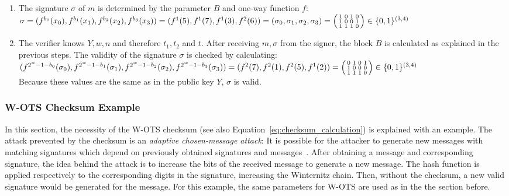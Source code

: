\begin{enumerate}
\item %
The signature $\sigma$ of $m$ is determined by the parameter $B$ and one-way function $f$: \\ %
$\sigma = (f^{b_0}(x_0), f^{b_1}(x_1),f^{b_2}(x_2),f^{b_3}(x_3)) = (f^1(5),f^1(7),f^1(3),f^2(6)) = (\sigma_0, \sigma_1, \sigma_2, \sigma_3) = \\
\begin{psmallmatrix}
1 & 0 & 1 & 0 \\
1 & 0 & 0 & 1 \\
1 & 1 & 1 & 0
\end{psmallmatrix} \in \{0,1\}^{(3,4)} $

\item The verifier knows $Y, w, n$ and therefore $t_1, t_2$ and $t$. After receiving $m, \sigma$ from the signer, the block $B$ is calculated as explained in the previous steps. The validity of the signature $\sigma$ is checked by calculating: \\
$( f^{2^w-1-b_0}(\sigma_0), f^{2^w-1-b_1}(\sigma_1), f^{2^w-1-b_2}(\sigma_2), f^{2^w-1-b_3}(\sigma_3)) = (f^2(7) , f^2(1), f^2(5), f^1(2)) = \\ \begin{psmallmatrix}
0 & 1 & 0 & 1 \\
1 & 0 & 0 & 0 \\
1 & 1 & 1 & 0
\end{psmallmatrix} \in \{0,1\}^{(3,4)} $
\\ Because these values are the same as in the public key $Y$, $\sigma$ is valid. 

\end{enumerate}

\subsubsection{W-OTS Checksum Example}
\label{sec:checksum_explained}
In this section, the necessity of the W-OTS checksum (see also Equation~\ref{eq:checksum_calculation}) is explained with an example. 
The attack prevented by the checksum is an \textit{adaptive chosen-message attack}: It is possible for the attacker to generate new messages with matching signatures which depend on previously obtained signatures and messages~\cite{cha:bg_signature_schemes_book_menezes2018_1997}. 
After obtaining a message and corresponding signature, the idea behind the attack is to increase the bits of the received message to generate a new message. The hash function is applied respectively to the corresponding digits in the signature, increasing the Winternitz chain. Then, without the checksum, a new valid signature would be generated for the message. For this example, the same parameters for W-OTS are used as in the the section before. %

